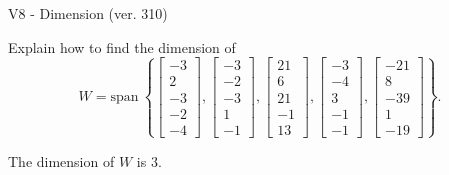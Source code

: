 \begin{exercise}
  \begin{exerciseTitle}V8 - Dimension (ver. 310)\end{exerciseTitle}
  \begin{exerciseStatement}
    Explain how to find the dimension of 
\[W=\mathrm{span}\ \left\{\left[\begin{array}{r}
-3 \\
2 \\
-3 \\
-2 \\
-4
\end{array}\right] , \left[\begin{array}{r}
-3 \\
-2 \\
-3 \\
1 \\
-1
\end{array}\right] , \left[\begin{array}{r}
21 \\
6 \\
21 \\
-1 \\
13
\end{array}\right] , \left[\begin{array}{r}
-3 \\
-4 \\
3 \\
-1 \\
-1
\end{array}\right] , \left[\begin{array}{r}
-21 \\
8 \\
-39 \\
1 \\
-19
\end{array}\right]\right\}.\]



  \end{exerciseStatement}
  \begin{exerciseAnswer}
   The dimension of \(W\) is  \(3\).
  


  \end{exerciseAnswer}
\end{exercise}